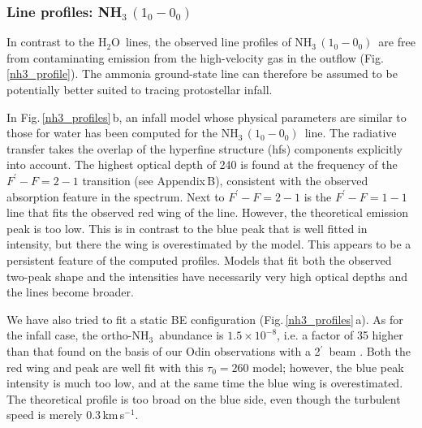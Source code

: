 \documentclass{aa}
\newcommand{\kms}{km\,s$^{-1}$}       %
\newcommand{\water}{H$_{2}$O}
\newcommand{\ammonia}{{\rm NH}$_3$}
\newcommand{\ettnoll}{{\rm NH}$_3\,(1_0 - 0_0)$}
\newcommand{\amin}{$^{\prime}$}                   %
\begin{document}
\subsubsection{Line profiles: \ettnoll}

In contrast to the \water\ lines, the observed line profiles of \ettnoll\ are free from contaminating emission from the high-velocity gas in the outflow (Fig.\,\ref{nh3_profile}). The ammonia ground-state line can therefore be assumed to be potentially better suited to tracing protostellar infall.

In Fig.\,\ref{nh3_profiles}\,b, an infall model whose physical parameters are similar to  those for water has been computed for the \ettnoll\ line. The radiative transfer takes the overlap of the hyperfine structure (hfs) components explicitly into account. The highest optical depth of 240 is found at the frequency of the $F^{\prime} - F = 2 -1$ transition (see Appendix\,B), consistent with the observed absorption feature in the spectrum. Next to $F^{\prime} - F = 2 -1$ is the $F^{\prime} - F = 1 -1$  line that fits the observed red wing of the line. However, the theoretical emission peak is too low. This is in contrast to the blue peak that is well fitted in intensity, but there the wing is overestimated by the model. This appears to be a persistent feature of the computed profiles. Models that fit both the observed two-peak shape and the intensities have necessarily very high optical depths and the lines become broader. 

We have also tried to fit a static BE configuration (Fig.\,\ref{nh3_profiles}\,a).  As for the infall case, the ortho-\ammonia\ abundance is $1.5 \times 10^{-8}$, i.e. a factor of 35 higher than that found on the basis of our Odin observations with a 2\amin\ beam \citep{liseau2003}. Both the red wing and peak are well fit with this $\tau_0=260$ model; however, the blue peak intensity is much too low, and at the same time the blue wing is overestimated. The theoretical profile is too broad on the blue side, even though the turbulent speed is merely 0.3\,\kms. 

\begin{figure*}
  \caption{{\bf Upper:} Part of the observed {\it Herschel}-HIFI map in the ground state line of  o-\ammonia;  the scales are indicated in the upper right corner. {\bf Lower:}  Observed high-resolution (HRS) \ettnoll\ line profiles towards SM\,1N  shown  as histograms. The red lines show a static BE model in {\bf a}, whereas in {\bf b} an infall model is shown. The positions of the hfs components are shown as vertical bars, the lengths of which are normalized to 1.0, and their quantum numbers are indicated in {\bf a} (see Appendix\,B). {\bf c} shows the results of Gaussian hfs profile fitting for two velocity components, the parameters of which are inscribed.
        }
  \label{nh3_profiles}
\end{figure*}
\end{document}

